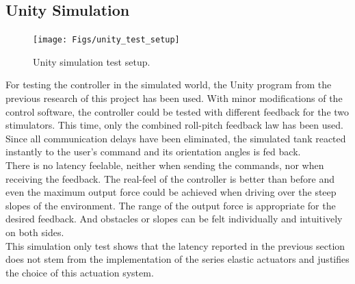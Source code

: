 \subsection{Unity Simulation}
\begin{figure}[h!]
	\centering
	\texttt{[image: Figs/unity\_test\_setup]}
	\caption{Unity simulation test setup.}
	\label{fig:unity_test_setup}
\end{figure}
For testing the controller in the simulated world, the Unity program from the previous research of this project has been used. With minor modifications of the control software, the controller could be tested with different feedback for the two stimulators. This time, only the combined roll-pitch feedback law has been used.\\
Since all communication delays have been eliminated, the simulated tank reacted instantly to the user's command and its orientation angles is fed back. \\
There is no latency feelable, neither when sending the commands, nor when receiving the feedback. The real-feel of the controller is better than before and even the maximum output force could be achieved when driving over the steep slopes of the environment. The range of the output force is appropriate for the desired feedback. And obstacles or slopes can be felt individually and intuitively on both sides.\\
This simulation only test shows that the latency reported in the previous section does not stem from the implementation of the series elastic actuators and justifies the choice of this actuation system.\\

